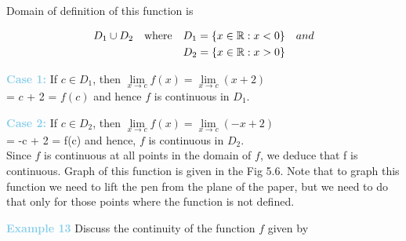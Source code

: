 \documentclass[a4paper,12pt]{article}
\begin{document}
\noindent Domain of definition of this function is

\[
\hspace{0cm}
\begin{aligned}
    D_1 \cup D_2 & \quad \text{where} \quad D_1 = \{x \in \mathbb{R} : x < 0\} \quad and  \\
                 & \quad \quad \quad \quad \hspace{2mm} D_2 = \{x \in \mathbb{R} : x > 0\}
\end{aligned}
\]

\noindent \textbf{\textcolor{skyblue}{Case 1:}} If $c \in D_1$, then  
$\lim\limits_{x \to c} f(x) = \lim\limits_{x \to c} (x+2)$ \\
\vspace{4pt}
\noindent = $c$ + 2 = $f(c)$ and hence $f$ is continuous in $D_1$.


\vspace{4pt}

\noindent \textbf{\textcolor{skyblue}{Case 2:}} If $c \in D_2$, then
$\lim\limits_{x \to c} f(x) = \lim\limits_{x \to c} (-x + 2)$ \\
\vspace{4pt}
= -c + 2 = f(c) and hence, $f$ is continuous in $D_2$.\\ Since $f$ is continuous at all points in the domain of $f$,  we deduce that f is continuous. Graph of this
 function is given in the Fig 5.6. Note that to graph
 this function we need to lift the pen from the plane
 of the paper, but we need to do that only for those points where the function is not
 defined.

\vspace{10pt} %

\noindent \textbf{\textcolor{skyblue}{Example 13}} Discuss the continuity of the function $f$ given by
\end{document}
